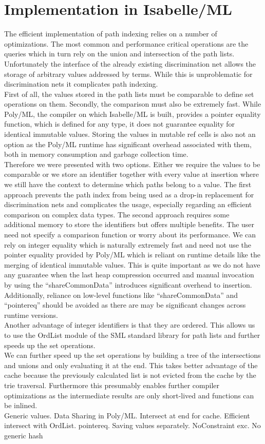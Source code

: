 \section{Implementation in Isabelle/ML}
The efficient implementation of path indexing relies on a number of optimizations. The most common and performance critical operations are the queries which in turn rely on the union and intersection of the path lists. Unfortunately the interface of the already existing discrimination net allows the storage of arbitrary values addressed by terms. While this is unproblematic for discrimination nets it complicates path indexing.\\
First of all, the values stored in the path lists must be comparable to define set operations on them. Secondly, the comparison must also be extremely fast. While Poly/ML, the compiler on which Isabelle/ML is built, provides a pointer equality function, which is defined for any type, it does not guarantee equality for identical immutable values. Storing the values in mutable ref cells is also not an option as the Poly/ML runtime has significant overhead associated with them, both in memory consumption and garbage collection time.\\
Therefore we were presented with two options. Either we require the values to be comparable or we store an identifier together with every value at insertion where we still have the context to determine which paths belong to a value. The first approach prevents the path index from being used as a drop-in replacement for discrimination nets and complicates the usage, especially regarding an efficient comparison on complex data types. The second approach requires some additional memory to store the identifiers but offers multiple benefits. The user need not specify a comparison function or worry about its performance. We can rely on integer equality which is naturally extremely fast and need not use the pointer equality provided by Poly/ML which is reliant on runtime details like the merging of identical immutable values. This is quite important as we do not have any guarantee when the last heap compression occurred and manual invocation by using the ``shareCommonData'' introduces significant overhead to insertion. Additionally, reliance on low-level functions like ``shareCommonData'' and ``pointereq'' should be avoided as there are may be significant changes across runtime versions.\\
Another advantage of integer identifiers is that they are ordered. This allows us to use the OrdList module of the SML standard library for path lists and further speeds up the set operations.\\
We can further speed up the set operations by building a tree of the intersections and unions and only evaluating it at the end. This takes better advantage of the cache because the previously calculated list is not evicted from the cache by the trie traversal. Furthermore this presumably enables further compiler optimizations as the intermediate results are only short-lived and functions can be inlined.\\

Generic values.
Data Sharing in Poly/ML. Intersect at end for cache. Efficient intersect with OrdList. pointereq. Saving values separately. NoConstraint exc. No generic hash
